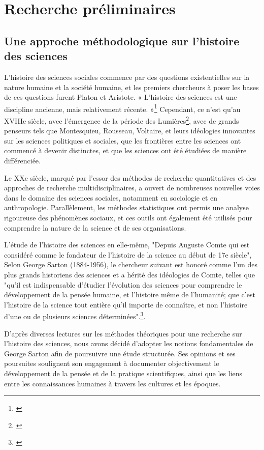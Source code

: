 \part{Recherche préliminaires}

\chapter{Une approche méthodologique sur l'histoire des sciences}
 L'histoire des sciences sociales commence par des questions existentielles sur la nature humaine et la société humaine, et les premiers chercheurs à poser les bases de ces questions furent Platon et Aristote. « L'histoire des sciences est une discipline ancienne, mais relativement récente. »\footnote{\cites{daston}} Cependant, ce n'est qu'au XVIIIe siècle, avec l'émergence de la période des Lumières\footnote{\cites{canada}}, avec de grands penseurs tels que Montesquieu, Rousseau, Voltaire, et leurs idéologies innovantes sur les sciences politiques et sociales, que les frontières entre les sciences ont commencé à devenir distinctes, et que les sciences ont été étudiées de manière différenciée.

Le XXe siècle, marqué par l'essor des méthodes de recherche quantitatives et des approches de recherche multidisciplinaires, a ouvert de nombreuses nouvelles voies dans le domaine des sciences sociales, notamment en sociologie et en anthropologie. Parallèlement, les méthodes statistiques ont permis une analyse rigoureuse des phénomènes sociaux, et ces outils ont également été utilisés pour comprendre la nature de la science et de ses organisations.

L'étude de l'histoire des sciences en elle-même, "Depuis Auguste Comte qui est considéré comme le fondateur de l’histoire de la science au début de 17e siècle", Selon George Sarton (1884-1956), le chercheur suivant est honoré comme l'un des plus grands historiens des sciences et a hérité des idéologies de Comte, telles que "qu’il est indispensable d’étudier l’évolution des sciences pour comprendre le développement de la pensée humaine, et l’histoire même de l'humanité; que c’est l’histoire de la science tout entière qu’il importe de connaître, et non l’histoire d’une ou de plusieurs sciences déterminées".\footnote{\cites{911}}. 

D'après diverses lectures sur les méthodes théoriques pour une recherche sur l'histoire des sciences, nous avons décidé d'adopter les notions fondamentales de George Sarton afin de poursuivre une étude structurée. Ses opinions et ses poursuites soulignent son engagement à documenter objectivement le développement de la pensée et de la pratique scientifiques, ainsi que les liens entre les connaissances humaines à travers les cultures et les époques.


